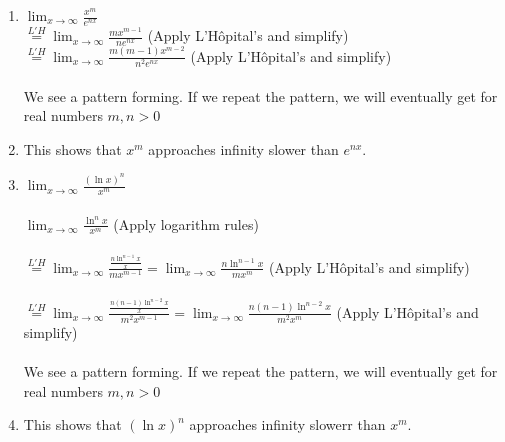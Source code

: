 \documentclass[9pt]{article}
\begin{document}
\begin {enumerate}
	\item  
		$\displaystyle \lim_{x \to \infty} \frac{x^m}{e^{nx}}$ \\
		$ \displaystyle \stackrel{L'H}{=} \lim_{x \to \infty} \frac{mx^{m-1}}{ne^{nx}} $ \hfill (Apply L'Hôpital's and simplify) \\
		$ \displaystyle \stackrel{L'H}{=} \lim_{x \to \infty} \frac{m(m-1)x^{m-2}}{n^2e^{nx}} $ \hfill (Apply L'Hôpital's and simplify) \\
		\\We see a pattern forming. If we repeat the pattern, we will eventually get  for real numbers $m, n > 0$
	\item This shows that $x^m$ approaches infinity slower than $e^{nx}$. 
	\item 
		$ \displaystyle  \lim_{x \to  \infty} \frac{(\ln  x)^n}{x^m} $ \\
		\\$ \displaystyle  \lim_{x \to  \infty} \frac{\ln^n  x}{x^m} $  \hfill (Apply logarithm rules) \\
		\\$ \displaystyle  \stackrel{L'H}{=} \lim_{x \to  \infty} \frac{\frac{n\ln^{n-1}x}{x}}{mx^{m-1}} =  \lim_{x \to  \infty} \frac{n\ln^{n-1}x}{mx^{m}}$ \hfill (Apply L'Hôpital's and simplify)\\
		\\$ \displaystyle  \stackrel{L'H}{=} \lim_{x \to  \infty} \frac{\frac{n(n-1)\ln^{n-2}x}{x}}{m^2x^{m-1}} =  \lim_{x \to  \infty} \frac{n(n-1)\ln^{n-2}x}{m^2x^{m}}$ \hfill (Apply L'Hôpital's and simplify)\\
		\\We see a pattern forming. If we repeat the pattern, we will eventually get  for real numbers $m, n > 0$
	\item This shows that $(\ln x)^n$ approaches infinity slowerr than $ x^m$.
\end {enumerate}

\fi

\newpage

\vspace{5mm}
\end{document}
